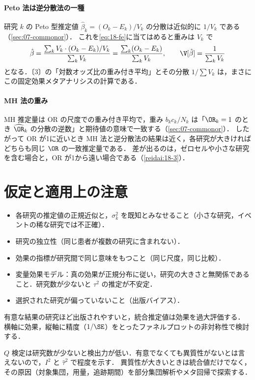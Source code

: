 \paragraph{Peto 法は逆分散法の一種}
研究 $k$ の Peto 型推定値 $\hat\beta_k=(O_k-E_k)/V_k$ の分散は近似的に $1/V_k$ である（\cref{sec:07-commonor}）．
これを\cref{eq:18-fe}に当てはめると重みは $V_k$ で
\[
\hat\beta=\frac{\sum_kV_k\cdot(O_k-E_k)/V_k}{\sum_kV_k}=\frac{\sum_k(O_k-E_k)}{\sum_kV_k},\qquad \V[\hat\beta]=\frac1{\sum_kV_k}
\]
となる．〔3〕の「対数オッズ比の重み付き平均」とその分散 $1/\sum V_k$ は，まさにこの固定効果メタアナリシスの計算である．
\paragraph{MH 法の重み}
MH 推定量は OR の尺度での重み付き平均で，重み $b_kc_k/N_k$ は「$\OR_k=1$ のとき $\widehat\OR_k$ の分散の逆数」と期待値の意味で一致する（\cref{sec:07-commonor}）．
したがって OR が1に近いとき MH 法と逆分散法の結果は近く，各研究が大きければどちらも同じ $\OR$ の一致推定量である．
差が出るのは，ゼロセルや小さな研究を含む場合と，OR が1から遠い場合である（\cref{reidai:18-3}）．

\section{仮定と適用上の注意}\label{sec:18-assump}
\begin{itemize}
\item 各研究の推定値の正規近似と，$\sigma_k^2$ を既知とみなせること（小さな研究，イベントの稀な研究では不正確）．
\item 研究の独立性（同じ患者が複数の研究に含まれない）．
\item 効果の指標が研究間で同じ意味をもつこと（同じ尺度，同じ比較）．
\item 変量効果モデル：真の効果が正規分布に従い，研究の大きさと無関係であること．研究数が少ないと $\tau^2$ の推定が不安定．
\item 選択された研究が偏っていないこと（出版バイアス）．
\end{itemize}
\begin{supbox}[補足：出版バイアス]
有意な結果の研究ほど出版されやすいと，統合推定値は効果を過大評価する．
横軸に効果，縦軸に精度（$1/\SE$）をとったファネルプロットの非対称性で検討する．
\end{supbox}
\Youchui $Q$ 検定は研究数が少ないと検出力が低い．有意でなくても異質性がないとは言えないので，$I^2$ と $\hat\tau^2$ で程度を示す．
異質性が大きいときは統合値だけでなく，その原因（対象集団，用量，追跡期間）を部分集団解析やメタ回帰で探索する．

